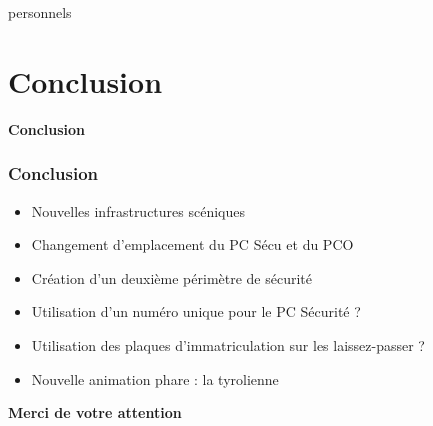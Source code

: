 \documentclass[xcolor=table]{beamer}
\begin{document}
\begin{frame}
\begin{itemize}
personnels
\end{itemize}

\end{frame}

\section{Conclusion}

\begin{frame}

\centering\Huge{\textbf{Conclusion}}

\end{frame}

\begin{frame}

\frametitle{Conclusion}
\begin{itemize}
\item Nouvelles infrastructures scéniques
\vspace{2mm}
\item Changement d'emplacement du PC Sécu et du PCO
\vspace{2mm}
\item Création d'un deuxième périmètre de sécurité
\vspace{2mm}
\item Utilisation d'un numéro unique pour le PC Sécurité ?
\vspace{2mm}
\item Utilisation des plaques d'immatriculation sur les laissez-passer ?
\vspace{2mm}
\item Nouvelle animation phare : la tyrolienne
\end{itemize}

\end{frame}

\begin{frame}
\centering\huge{\textbf{Merci de votre attention}}
\vspace{1cm}
\begin{Parallel}{.5\textwidth}{.5\textwidth}
\end{Parallel}

\end{frame}
\end{document}
